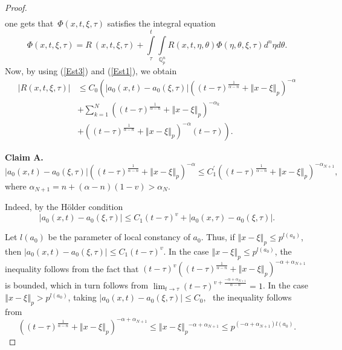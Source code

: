 \documentclass{amsart}\usepackage{amsfonts}
\theoremstyle{plain}
\numberwithin{equation}{section}
\begin{document}
\begin{proof}
\begin{align*}
\end{align*}
one gets that\ $\Phi(x,t,\xi,\tau)$ satisfies the integral equation\begin{equation}
\Phi(x,t,\xi,\tau)=R\ (x,t,\xi,\tau)+{\displaystyle\int\limits_{\tau}^{t}}
\underset{\mathbb{Q}_{p}^{n}}{\int}R(x,t,\eta,\theta)\Phi(\eta,\theta,\xi
,\tau)d^{n}\eta d\theta. \label{IntEqua}\end{equation}
Now, by using (\ref{Est3}) and (\ref{Est1}), we obtain\begin{align}
\left\vert R(x,t,\xi,\tau)\right\vert  &  \leq C_{0}\left(  \left\vert
a_{0}(x,t)-a_{0}(\xi,\tau)\right\vert ((t-\tau)^{\frac{1}{\alpha-n}}+\left\Vert x-\xi\right\Vert _{p})^{-\alpha}\right. \nonumber\\
&  +{\displaystyle\sum\limits_{k=1}^{N}}
\left(  (t-\tau)^{\frac{1}{\alpha-n}}+\left\Vert x-\xi\right\Vert _{p}\right)
^{-\alpha_{k}}\nonumber\\
&  \left.  +\left(  (t-\tau)^{\frac{1}{\alpha-n}}+\left\Vert x-\xi\right\Vert
_{p}\right)  ^{-\alpha}(t-\tau)\right)  . \label{Est_R}\end{align}


\textbf{Claim A. }\[
\left\vert a_{0}(x,t)-a_{0}(\xi,\tau)\right\vert ((t-\tau)^{\frac{1}{\alpha
-n}}+\left\Vert x-\xi\right\Vert _{p})^{-\alpha}\leq C_{1}^{\prime}((t-\tau)^{\frac{1}{\alpha-n}}+\left\Vert x-\xi\right\Vert _{p})^{-\alpha
_{N+1}},
\]
where $\alpha_{N+1}=n+\left(  \alpha-n\right)  (1-v)>\alpha_{N}$.

Indeed, by the Hölder condition\
\[
\left\vert a_{0}(x,t)-a_{0}(\xi,\tau)\right\vert \leq C_{1}(t-\tau
)^{v}+\left\vert a_{0}\left(  x,\tau\right)  -a_{0}\left(  \xi,\tau\right)
\right\vert .
\]


Let $l\left(  a_{0}\right)  $ be the parameter of local constancy of $a_{0}$.
Thus, if $\left\Vert x-\xi\right\Vert _{p}\leq p^{l\left(  a_{0}\right)  }$,
then $\left\vert a_{0}(x,t)-a_{0}(\xi,\tau)\right\vert \leq C_{1}(t-\tau)^{v}$. In the case $\left\Vert x-\xi\right\Vert _{p}\leq p^{l\left(  a_{0}\right)
}$, the inequality follows from the fact that $(t-\tau)^{v}((t-\tau)^{\frac
{1}{\alpha-n}}+\left\Vert x-\xi\right\Vert _{p})^{-\alpha+\alpha_{N+1}}$ is
bounded, which in turn follows from $\lim_{t\rightarrow\tau}(t-\tau
)^{v+\frac{-\alpha+\alpha_{N+1}}{\alpha-n}}=1$. In the case $\left\Vert
x-\xi\right\Vert _{p}>p^{l\left(  a_{0}\right)  }$, taking $\left\vert
a_{0}(x,t)-a_{0}(\xi,\tau)\right\vert \leq C_{0}$, \ the inequality follows
from\[
((t-\tau)^{\frac{1}{\alpha-n}}+\left\Vert x-\xi\right\Vert _{p})^{-\alpha
+\alpha_{N+1}}\leq\left\Vert x-\xi\right\Vert _{p}{}^{-\alpha+\alpha_{N+1}}\leq p{}^{\left(  -\alpha+\alpha_{N+1}\right)  l\left(  a_{0}\right)  }.
\]



\end{proof}
\end{document}
